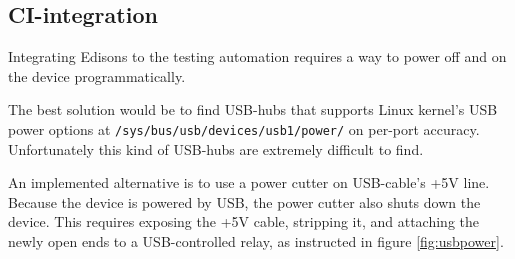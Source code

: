 \documentclass[a4paper,11pt]{article}
\newcommand{\cmd}[1]{\texttt{#1}}
\begin{document}
\subsection{CI-integration}

Integrating Edisons to the testing automation requires a way to power off and on the device programmatically.

The best solution would be to find USB-hubs that supports Linux kernel's USB power options at \cmd{/sys/bus/usb/devices/usb1/power/} on per-port accuracy. Unfortunately this kind of USB-hubs are extremely difficult to find.

An implemented alternative is to use a power cutter on USB-cable's +5V line. Because the device is powered by USB, the power cutter also shuts down the device. This requires exposing the +5V cable, stripping it, and attaching the newly open ends to a USB-controlled relay, as instructed in figure \ref{fig:usbpower}.
\end{document}

